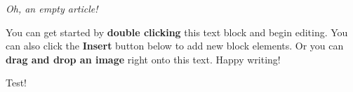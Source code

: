 \textit{Oh, an empty article!} 







You can get started by \textbf{double clicking} this text block and begin editing. You can also click the \textbf{Insert} button below to add new block elements. Or you can \textbf{drag and drop an image} right onto this text. Happy writing!

Test!

